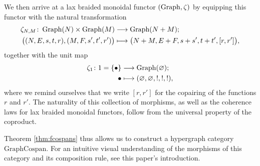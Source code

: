 We then arrive at a lax braided monoidal functor $(\operatorname{Graph},\zeta)$ by equipping
this functor with the natural transformation 
\begin{align*}
  \zeta_{N,M}\colon  \operatorname{Graph}(N) \times \operatorname{Graph}(M)
  &\longrightarrow \operatorname{Graph}(N+M); \\
  \big( (N,E,s,t,r), (M,F,s',t',r') \big) &\longmapsto
  \big(N+M,E+F,s+s',t+t',[r,r']\big),
\end{align*}
together with the unit map
\begin{align*}
  \zeta_1\colon  1=\{\bullet\} &\longrightarrow \operatorname{Graph}(\varnothing); \\
  \bullet &\longmapsto
  (\varnothing,\varnothing,!,!,!),
\end{align*}
where we remind ourselves
that we write $[r,r']$ for the copairing of the functions $r$ and $r'$. The
naturality of this collection of morphisms, as well as the coherence laws for
lax braided monoidal functors, follow from the universal property of the coproduct.

Theorem \ref{thm:fcospans} thus allows us to construct a hypergraph category
$\mathrm{GraphCospan}$.  For an intuitive visual understanding of the morphisms
of this category and its composition rule, see this paper's introduction.

